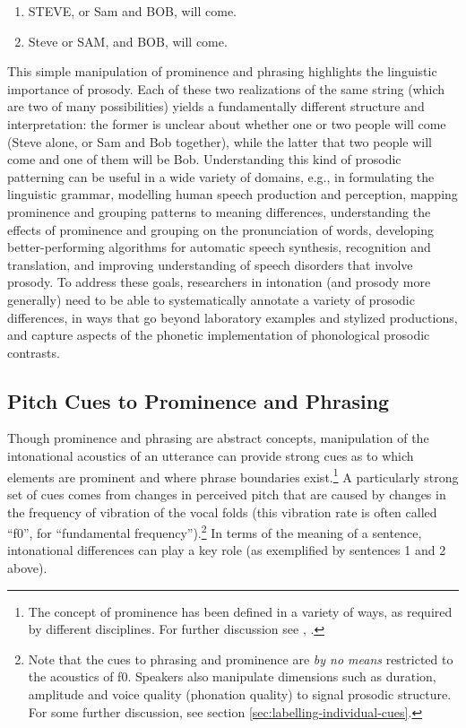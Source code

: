 \begin{enumerate} \def\labelenumi{\arabic{enumi}.}
\item STEVE, or Sam and BOB, will come.
\item Steve or SAM, and BOB, will come. \end{enumerate}

This simple manipulation of prominence and phrasing highlights the linguistic importance of prosody. Each of these two realizations of the same string (which are two of many possibilities) yields a fundamentally different structure and interpretation: the former is unclear about whether one or two people will come (Steve alone, or Sam and Bob together), while the latter \DIFdelbegin {}\DIFdelend \DIFaddbegin {}\DIFaddend that two people will come and one of them will be Bob. Understanding this kind of prosodic patterning can be useful in a wide variety of domains, e.g., in formulating the linguistic grammar, modelling human speech production and perception, mapping prominence and grouping patterns to meaning differences, understanding the effects of prominence and grouping on the pronunciation of words, developing better-performing algorithms for automatic speech synthesis, recognition and translation, and improving understanding of speech disorders that involve prosody. To address these goals, researchers in intonation (and prosody more generally) need to be able to systematically annotate a variety of prosodic differences, in ways that go beyond laboratory examples and stylized productions, and capture aspects of the phonetic implementation of phonological prosodic contrasts.

\subsection{Pitch Cues to Prominence and Phrasing}\label{sec:pitch-cues-to-prominence-and-phrasing}

Though prominence and phrasing are abstract concepts, manipulation of the intonational acoustics of an utterance can provide strong cues as to which elements are prominent and where phrase boundaries exist.\footnote{The concept of prominence has been defined in a variety of ways, as required by different disciplines. For further discussion see \citealt{gussenhoven15}, \citealt{wagner-15}.} A particularly strong set of cues comes from changes in perceived pitch that are caused by changes in the frequency of vibration of the vocal folds (this vibration rate is often called “f0”, for “fundamental frequency”).\footnote{Note that the cues to phrasing and prominence are \textit{by no means} restricted to the acoustics of f0.  Speakers also manipulate dimensions such as duration, amplitude and voice quality (phonation quality) to signal prosodic structure. For some further discussion, see section \ref{sec:labelling-individual-cues}.} In terms of the meaning of a sentence, intonational differences can play a key role (as exemplified by sentences 1 and 2 above).

